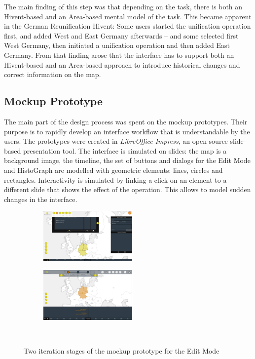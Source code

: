 The main finding of this step was that depending on the task, there is both an Hivent-based and an Area-based mental model of the task. This became apparent in the German Reunification Hivent: Some users started the unification operation first, and added West and East Germany afterwards -- and some selected first West Germany, then initiated a unification operation and then added East Germany. From that finding arose that the interface has to support both an Hivent-based and an Area-based approach to introduce historical changes and correct information on the map.


\subsection{Mockup Prototype} %
\label{sub:mockup_prototype}

The main part of the design process was spent on the mockup prototypes. Their purpose is to rapidly develop an interface workflow that is understandable by the users. The prototypes were created in \emph{LibreOffice Impress}, an open-source slide-based presentation tool. The interface is simulated on slides: the map is a background image, the timeline, the set of buttons and dialogs for the Edit Mode and HistoGraph are modelled with geometric elements: lines, circles and rectangles. Interactivity is simulated by linking a click on an element to a different slide that shows the effect of the operation. This allows to model sudden changes in the interface.

\begin{figure}[ht]
  \centering
  \begin{subfigure}[b]{.5\textwidth}
    \centering
    \includegraphics[width=180px]{graphics/development/design_process/mockup_prototype_1.png}
  \end{subfigure}%
  \begin{subfigure}[b]{.5\textwidth}
    \centering
    \includegraphics[width=180px]{graphics/development/design_process/mockup_prototype_3.png}
  \end{subfigure} \\[0.8em]
  \caption{Two iteration stages of the mockup prototype for the Edit Mode}
  \label{fig:mockup_prototypes}
\end{figure}

